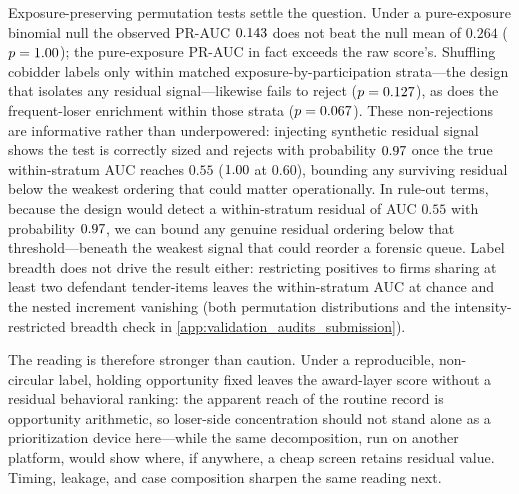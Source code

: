 Exposure-preserving permutation tests settle the question. Under a
pure-exposure binomial null the observed PR-AUC
$0.143$ does not beat the null mean of $0.264$
($p=1.00$); the pure-exposure PR-AUC in fact exceeds the
raw score's. Shuffling cobidder labels only within matched
exposure-by-participation strata---the design that isolates any
residual signal---likewise fails to reject ($p=0.127$), as
does the frequent-loser enrichment within those strata
($p=0.067$). These non-rejections are informative rather
than underpowered: injecting synthetic residual signal shows the
test is correctly sized and rejects with probability
$0.97$ once the true within-stratum AUC reaches
$0.55$ ($1.00$ at $0.60$), bounding any surviving
residual below the weakest ordering that could matter
operationally. In rule-out terms, because the design would detect a within-stratum residual of AUC $0.55$ with probability $0.97$, we can bound any genuine residual ordering below that threshold---beneath the weakest signal that could reorder a forensic queue. %
Label breadth does not drive the result either:
restricting positives to firms sharing at least two defendant
tender-items leaves the within-stratum AUC at chance and the nested
increment vanishing (both permutation distributions and the
intensity-restricted breadth check in
\ref{app:validation_audits_submission}).

The reading is therefore stronger than caution. Under a
reproducible, non-circular label, holding opportunity fixed leaves
the award-layer score without a residual behavioral ranking: the
apparent reach of the routine record is opportunity arithmetic, so
loser-side concentration should not stand alone as a prioritization
device here---while the same decomposition, run on another platform,
would show where, if anywhere, a cheap screen retains residual
value. Timing, leakage, and case composition sharpen the same
reading next.

